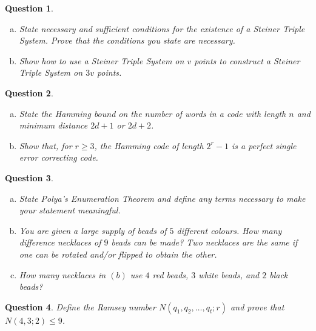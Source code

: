\documentclass[12]{article}
\newtheorem{question}{Question}
\theoremstyle{definition}
\begin{document}
	\begin{question}
		\
		\begin{enumerate}[a)]
			\item State necessary and sufficient conditions for the existence of a Steiner Triple System.  Prove that the conditions you state are necessary.
			\item Show how to use a Steiner Triple System on $v$ points to construct a Steiner Triple System on $3v$ points.
		\end{enumerate}
	\end{question}

	\begin{question}
		\
		\begin{enumerate}[a)]
			\item State the Hamming bound on the number of words in a code with length $n$ and minimum distance $2d+1$ or $2d+2$.
			\item Show that, for $r \geq 3$, the Hamming code of length $2^r-1$ is a perfect single error correcting code.
		\end{enumerate}
	\end{question}

	\begin{question}
		\
		\begin{enumerate}[a)]
			\item State Polya's Enumeration Theorem and define any terms necessary to make your statement meaningful.
			\item You are given a large supply of beads of $5$ different colours.  How many difference necklaces of $9$ beads can be made?  Two necklaces are the same if one can be rotated and/or flipped to obtain the other.
			\item How many necklaces in $(b)$ use $4$ red beads, $3$ white beads, and $2$ black beads?
		\end{enumerate}
	\end{question}

	\newpage
	
	\begin{question}
		Define the Ramsey number $N(q_1, q_2, \ldots, q_t;r)$ and prove that $N(4,3;2) \leq 9$.
	\end{question}
\end{document}
